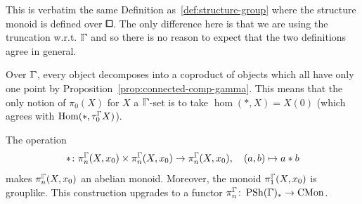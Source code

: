 This is verbatim the same Definition as~\ref{def:structure-group}
where the structure monoid is defined over $\bbox$.
The only difference here is that we are using the truncation w.r.t. $\bbGamma$
and so there is no reason to expect that the two definitions agree in general.

\begin{remark}
Over $\bbGamma$, every object decomposes into a coproduct of objects
which all have only one point by Proposition~\ref{prop:connected-comp-gamma}.
This means that the only notion of $\pi_0(X)$ for $X$ a $\bbGamma$-set is to take $\hom(\ast,X) = X(0)$
(which agrees with $\hom(\ast,\tau_0^{\bbGamma} X)$).
\end{remark}

\begin{proposition}\label{prop:structure-monoid-gamma}
The operation
\[
    *\colon\pi_n^{\bbGamma}(X,x_0)\times\pi_n^{\bbGamma}(X,x_0)\to\pi_n^{\bbGamma}(X,x_0),\quad (a,b)\mapsto a*b
\]
makes $\pi_n^{\bbGamma}(X,x_0)$ an abelian monoid.
Moreover, the monoid $\pi_1^{\bbGamma}(X,x_0)$ is grouplike.
This construction upgrades to a functor $\pi_n^{\bbGamma}\colon\PSh(\bbGamma)_{\ast}\to\cMon$.
\end{proposition}

